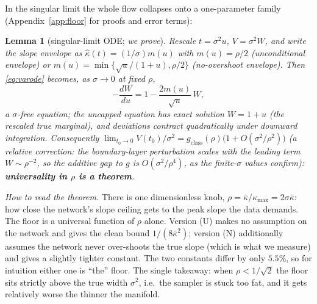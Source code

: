 \documentclass[11pt]{article}
\newtheorem{lemma}{Lemma}
\theoremstyle{remark}
\newcommand{\kb}{\bar\kappa}
\newcommand{\sigsq}{\sigma^2}
\begin{document}
In the singular limit the whole flow collapses onto a one-parameter family
(Appendix~\ref{app:floor} for proofs and error terms):

\begin{lemma}[singular-limit ODE; \emph{we prove}]\label{lem:limitode}
Rescale $t=\sigsq u$, $V=\sigsq W$, and write the slope envelope as
$\hat\kappa(t)=(1/\sigma)m(u)$ with $m(u)=\rho/2$ (unconditional envelope) or
$m(u)=\min\{\sqrt u/(1+u),\rho/2\}$ (no-overshoot envelope). Then \eqref{eq:varode}
becomes, as $\sigma\to0$ at fixed $\rho$,
\begin{equation}
-\frac{dW}{du}=1-\frac{2m(u)}{\sqrt u}\,W ,
\label{eq:limitode}
\end{equation}
a $\sigma$-free equation; the uncapped equation has exact solution $W=1+u$
(the rescaled true marginal), and deviations contract quadratically under downward
integration. Consequently
$\lim_{t_0\to0}V(t_0)/\sigsq=g_{\mathrm{class}}(\rho)\big(1+O(\sigsq/\rho^2)\big)$
(a \emph{relative} correction: the boundary-layer perturbation scales with the leading
term $W\sim\rho^{-2}$, so the additive gap to $g$ is $O(\sigsq/\rho^4)$, as the
finite-$\sigma$ values confirm):
\textbf{universality in $\rho$ is a theorem}.
\end{lemma}

\emph{How to read the theorem.} There is one dimensionless knob, $\rho=\kb/\kappa_{\max}=
2\sigma\kb$: how close the network's slope ceiling gets to the peak slope the data demands.
The floor is a universal function of $\rho$ alone. Version (U) makes no assumption on the
network and gives the clean bound $1/(8\kb^2)$; version (N) additionally assumes the
network never over-shoots the true slope (which is what we measure) and gives a slightly
tighter constant. The two constants differ by only $5.5\%$, so for intuition either one is
``the'' floor. The single takeaway: when $\rho<1/\sqrt2$ the floor sits strictly above the
true width $\sigsq$, i.e.\ the sampler is stuck too fat, and it gets relatively worse the
thinner the manifold.
\end{document}
